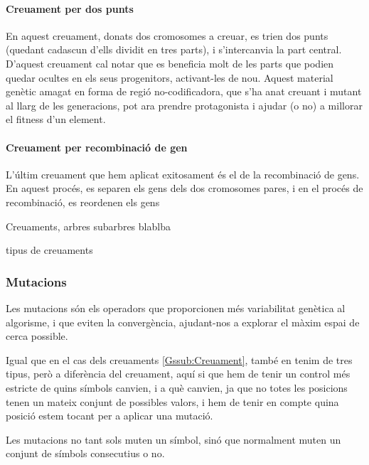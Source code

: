 \paragraph{Creuament per dos punts} %
\label{par:Creuament per dos punts}
En aquest creuament, donats dos cromosomes a creuar, es trien dos punts (quedant
cadascun d'ells dividit en tres parts), i s'intercanvia la part central.
D'aquest creuament cal notar que es beneficia molt de les parts que podien
quedar ocultes en els seus progenitors, activant-les de nou.  Aquest material
genètic amagat en forma de regió no-codificadora, que s'ha anat creuant i mutant
al llarg de les generacions, pot ara prendre protagonista i ajudar (o no) a
millorar el fitness d'un element.
\paragraph{Creuament per recombinació de gen} %
\label{par:Creuament per recombinacio de gen}

L'últim creuament que hem aplicat exitosament és el de la recombinació de gens.
En aquest procés, es separen els gens dels dos cromosomes pares, i en el procés
de recombinació, es reordenen els gens

Creuaments, arbres subarbres blablba

tipus de creuaments

\subsubsection{Mutacions} %
\label{Gssub:Mutacions}

Les mutacions són els operadors que proporcionen més variabilitat genètica al
algorisme, i que eviten la convergència, ajudant-nos a explorar el màxim espai
de cerca possible.

Igual que en el cas dels creuaments \ref{Gssub:Creuament}, també en tenim de
tres tipus, però a diferència del creuament, aquí si que hem de tenir un control
més estricte de quins símbols canvien, i a què canvien, ja que no totes les
posicions tenen un mateix conjunt de possibles valors, i hem de tenir en compte
quina posició estem tocant per a aplicar una mutació.

Les mutacions no tant sols muten un símbol, sinó que normalment muten un
conjunt de símbols consecutius o no.

